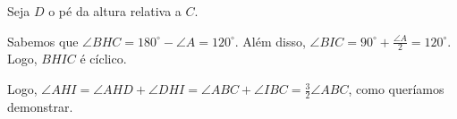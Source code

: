 Seja $D$ o pé da altura relativa a $C$.

Sabemos que $\angle BHC = 180^\circ - \angle A = 120^\circ$. Além disso, $\angle BIC = 90^\circ + \frac{\angle A}{2} = 120^\circ$. Logo, $BHIC$ é cíclico.

Logo, $\angle AHI = \angle AHD + \angle DHI = \angle ABC + \angle IBC = \frac{3}{2} \angle ABC$, como queríamos demonstrar.
